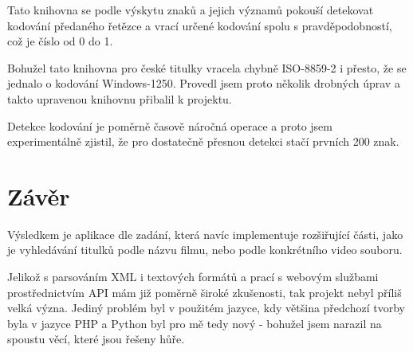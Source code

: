 \documentclass[a4paper,12]{article}
\begin{document}
Tato knihovna se podle výskytu znaků a jejich významů pokouší detekovat kodování předaného řetězce a vrací určené kodování spolu s pravděpodobností, což je číslo od 0 do 1. 

Bohužel tato knihovna pro české titulky vracela chybně ISO-8859-2 i přesto, že se jednalo o kodování Windows-1250. Provedl jsem proto několik drobných úprav a takto upravenou knihovnu přibalil k projektu.

Detekce kodování je poměrně časově náročná operace a proto jsem experimentálně zjistil, že pro dostatečně přesnou detekci stačí prvních 200 znak. 

\pagebreak

\part*{Závěr}
Výsledkem je aplikace dle zadání, která navíc implementuje rozšiřující části, jako je vyhledávání titulků podle názvu filmu, nebo podle konkrétního video souboru.

Jelikož s parsováním XML i textových formátů a prací s webovým službami prostřednictvím API mám již poměrně široké zkušenosti, tak projekt nebyl příliš velká význa. Jediný problém byl v použitém jazyce, kdy většina předchozí tvorby byla v jazyce PHP a Python byl pro mě tedy nový - bohužel jsem narazil na spoustu věcí, které jsou řešeny hůře.
\end{document}
